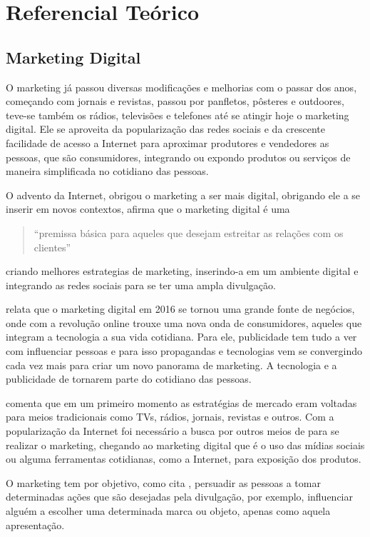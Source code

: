 \chapter[Referencial Teórico]{Referencial Teórico}
\section{Marketing Digital}
O marketing já passou diversas modificações e melhorias com o passar dos anos, começando com jornais e revistas, passou por panfletos, pôsteres e outdoores, teve-se também os rádios, televisões e telefones até se atingir hoje o marketing digital. Ele se aproveita da popularização das redes sociais e da crescente facilidade de acesso a Internet para aproximar produtores e vendedores as pessoas, que são consumidores, integrando ou expondo produtos ou serviços de maneira simplificada no cotidiano das pessoas.

O advento da Internet, obrigou o marketing a ser mais digital, obrigando ele a se inserir em novos contextos, \cite{canto2017} afirma que o marketing digital é uma \begin{quote} ``premissa básica para aqueles que desejam estreitar as relações com os clientes''\end{quote} criando melhores estrategias de marketing, inserindo-a em um ambiente digital e integrando as redes sociais para se ter uma ampla divulgação.

\cite[p.2]{ryan2016} relata que o marketing digital em 2016 se tornou uma grande fonte de negócios, onde com a revolução online trouxe uma nova onda de consumidores, aqueles que integram a tecnologia a sua vida cotidiana. Para ele, publicidade tem tudo a ver com influenciar pessoas e para isso propagandas e tecnologias vem se convergindo
cada vez mais para criar um novo panorama de marketing. A tecnologia e a publicidade de tornarem parte do cotidiano das pessoas.

\cite{santos2014} comenta que em um primeiro momento as estratégias de mercado eram voltadas para meios tradicionais como TVs, rádios, jornais, revistas e outros. Com a popularização da Internet foi necessário a busca por outros meios de para se realizar
o marketing, chegando ao marketing digital que é o uso das mídias sociais ou alguma ferramentas cotidianas, como a Internet, para exposição dos produtos.

O marketing tem por objetivo, como cita \cite{ryan2016}, persuadir as pessoas a tomar determinadas ações que são desejadas pela divulgação, por exemplo, influenciar alguém a escolher uma determinada marca ou objeto, apenas como aquela apresentação.

